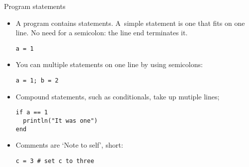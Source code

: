 \begin{block}{Program statements}
  \label{sl:cstatement}
  \begin{itemize}
  \item
    A program contains statements. A~simple statement
    is one that fits on one line. No need for a semicolon:
    the line end terminates it.
\begin{lstlisting}
a = 1
\end{lstlisting}
  \item You can multiple statements on one line by using semicolons:
\begin{lstlisting}
a = 1; b = 2
\end{lstlisting}
  \item Compound statements, such as conditionals, take up mutiple lines;
\begin{lstlisting}
if a == 1
  println("It was one")
end
\end{lstlisting}
\item Comments are `Note to self', short:
\begin{lstlisting}
c = 3 # set c to three
\end{lstlisting}
  \end{itemize}
\end{block}

